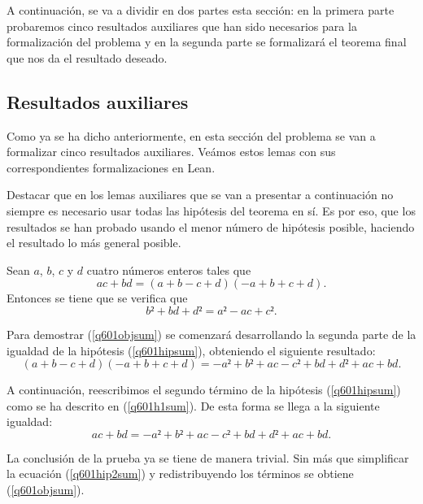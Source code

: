 A continuación, se va a dividir en dos partes esta sección: en la primera
parte probaremos cinco resultados auxiliares que han sido necesarios para
la formalización del problema y en la segunda parte se formalizará el
teorema final que nos da el resultado deseado.

\subsection{Resultados auxiliares}
Como ya se ha dicho anteriormente, en esta sección del problema se van
a formalizar cinco resultados auxiliares. Veámos estos lemas con sus
correspondientes formalizaciones en Lean.

Destacar que en los lemas auxiliares que se van a presentar a continuación
no siempre es necesario usar todas las hipótesis del teorema en sí. Es por eso,
que los resultados se han probado usando el menor número de hipótesis posible,
haciendo el resultado lo más general posible.

\begin{lema}\label{q601lemasuma}
  Sean \(a\), \(b\), \(c\) y \(d\) cuatro números enteros tales que 
    \begin{equation}\label{q601hipsum}\tag{h}
      ac+bd = (a+b-c+d)(-a+b+c+d).
    \end{equation}
    Entonces se tiene que se verifica que
    \begin{equation}\label{q601objsum}
      b²+bd+d²=a²-ac+c².
    \end{equation}
\end{lema}

\begin{demostracion}
  Para demostrar (\ref{q601objsum}) se comenzará desarrollando la segunda
  parte de la igualdad de la hipótesis (\ref{q601hipsum}), obteniendo el
  siguiente resultado:
  \begin{equation}\tag{h1}\label{q601h1sum}
    (a+b-c+d)(-a+b+c+d)=-a²+b²+ac-c²+bd+d²+ac+bd.
  \end{equation}

  A continuación, reescribimos el segundo término de la hipótesis
  (\ref{q601hipsum}) como se ha descrito en (\ref{q601h1sum}). De esta
  forma se llega a la siguiente igualdad:
  \begin{equation}\label{q601hip2sum}
    ac+bd=-a²+b²+ac-c²+bd+d²+ac+bd.
  \end{equation}

  La conclusión de la prueba ya se tiene de manera trivial. Sin más que
  simplificar la ecuación (\ref{q601hip2sum}) y redistribuyendo los términos
  se obtiene (\ref{q601objsum}).
\end{demostracion}

